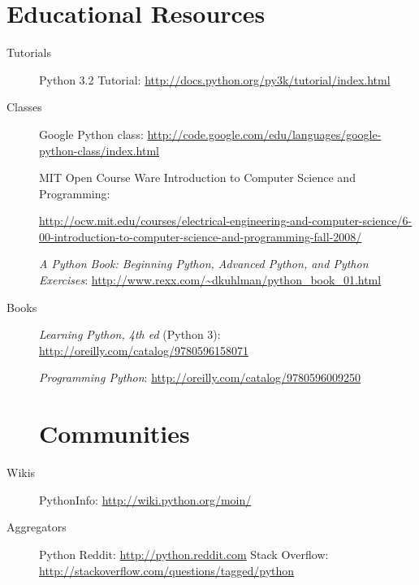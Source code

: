 \section{Educational Resources}
\begin{description}
	\item[Tutorials]

Python 3.2 Tutorial: \url{http://docs.python.org/py3k/tutorial/index.html}  \cite{website:Python3docs}
	\item[Classes]

Google Python class: \url{http://code.google.com/edu/languages/google-python-class/index.html} \cite{website:GooglePythonClass}

MIT Open Course Ware Introduction to Computer Science and Programming:

\href{http://ocw.mit.edu/courses/electrical-engineering-and-computer-science/6-00-introduction-to-computer-science-and-programming-fall-2008/}{http://ocw.mit.edu/courses/electrical-engineering-and-computer-science/6-00-introduction-to-computer-science-and-programming-fall-2008/} \cite{website:OCW}

\emph{A Python Book: Beginning Python, Advanced Python, and Python Exercises}: \url{http://www.rexx.com/~dkuhlman/python_book_01.html}

	\item[Books]
\emph{Learning Python, 4th ed} (Python 3): \url{http://oreilly.com/catalog/9780596158071}  \cite{LearningPython4th}

\emph{Programming Python}: \url{http://oreilly.com/catalog/9780596009250}  \cite{ProgrammingPython} 

\section{Communities}
	\item[Wikis]
PythonInfo: \url{http://wiki.python.org/moin/}
	\item[Aggregators]
Python Reddit: \url{http://python.reddit.com}
Stack Overflow: \url{http://stackoverflow.com/questions/tagged/python}

\end{description}